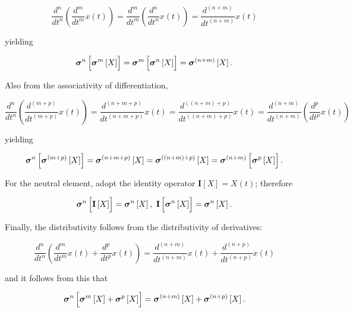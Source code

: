 \begin{equation} \dfrac{d^n}{dt^n}\left(\dfrac{d^m}{dt^m} x(t)\right) = \dfrac{d^m}{dt^m}\left(\dfrac{d^n}{dt^n} x(t)\right) = \dfrac{d^{(n+m)}}{dt^{(n+m)}} x(t) \end{equation}

	\noindent yielding

\begin{equation} \ndpo{n}\left[\raisebox{4mm}{} \ndpo{m}\left[X\right]\right] = \ndpo{m}\left[\raisebox{4mm}{} \ndpo{n}\left[X\right]\right] = \ndpo{(n+m)}\left[X\right] .\end{equation}

	Also from the associativity of differentiation,

\begin{equation} \dfrac{d^n}{dt^n}\left(\dfrac{d^{(m+p)}}{dt^{(m+p)}} x(t)\right) = \dfrac{d^{(n+m+p)}}{dt^{(n+m+p)}} x(t) = \dfrac{d^{((n+m)+p)}}{dt^{((n+m)+p)}} x(t) = \dfrac{d^{(n+m)}}{dt^{(n+m)}} \left(\dfrac{d^{p}}{dt^{p}} x(t)\right) \end{equation}

	\noindent yielding

\begin{equation} \ndpo{n}\left[\raisebox{4mm}{} \ndpo{(m+p)}\left[X\right]\right] = \ndpo{(n+m+p)}\left[X\right] = \ndpo{((n+m)+p)}\left[X\right] = \ndpo{(n+m)}\left[\raisebox{4mm}{} \ndpo{p}\left[X\right]\right] .\end{equation}

	For the neutral element, adopt the identity operator $\mathbf{I}\left[X\right] = X(t)$; therefore

\begin{equation} \ndpo{n}\left[\raisebox{4mm}{} \mathbf{I}\left[X\right]\right] = \ndpo{n}\left[X\right],\ \mathbf{I}\left[\raisebox{4mm}{} \ndpo{n}\left[X\right]\right] = \ndpo{n}\left[X\right] .\end{equation}

	Finally, the distributivity follows from the distributivity of derivatives:

\begin{equation} \dfrac{d^n}{dt^n}\left(\dfrac{d^m}{dt^m}x(t) + \dfrac{d^p}{dt^p}x(t)\right) = \dfrac{d^{(n+m)}}{dt^{(n+m)}}x(t) + \dfrac{d^{(n+p)}}{dt^{(n+p)}}x(t) \end{equation}

	\noindent and it follows from this that

\begin{equation} \ndpo{n}\left[\raisebox{4mm}{} \ndpo{m}\left[X\right] + \ndpo{p}\left[X\right]\right] = \ndpo{(n+m)}\left[X\right] + \ndpo{(n+p)}\left[X\right] .\end{equation}

